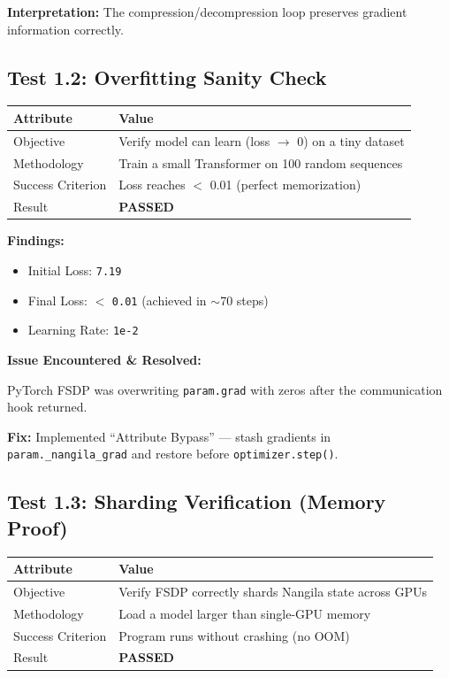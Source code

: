 \documentclass[11pt,a4paper]{article}
\begin{document}
\textbf{Interpretation:} The compression/decompression loop preserves gradient information correctly.

\subsection{Test 1.2: Overfitting Sanity Check}

\begin{table}[h]
\centering
\begin{tabular}{@{}ll@{}}
\toprule
\textbf{Attribute} & \textbf{Value} \\
\midrule
Objective & Verify model can learn (loss $\rightarrow$ 0) on a tiny dataset \\
Methodology & Train a small Transformer on 100 random sequences \\
Success Criterion & Loss reaches $<$ 0.01 (perfect memorization) \\
Result & \textcolor{pass}{\textbf{PASSED}} \\
\bottomrule
\end{tabular}
\end{table}

\textbf{Findings:}
\begin{itemize}
    \item Initial Loss: \texttt{7.19}
    \item Final Loss: $<$ \texttt{0.01} (achieved in $\sim$70 steps)
    \item Learning Rate: \texttt{1e-2}
\end{itemize}

\textbf{Issue Encountered \& Resolved:}

PyTorch FSDP was overwriting \texttt{param.grad} with zeros after the communication hook returned. 

\textbf{Fix:} Implemented ``Attribute Bypass'' --- stash gradients in \texttt{param.\_nangila\_grad} and restore before \texttt{optimizer.step()}.

\subsection{Test 1.3: Sharding Verification (Memory Proof)}

\begin{table}[h]
\centering
\begin{tabular}{@{}ll@{}}
\toprule
\textbf{Attribute} & \textbf{Value} \\
\midrule
Objective & Verify FSDP correctly shards Nangila state across GPUs \\
Methodology & Load a model larger than single-GPU memory \\
Success Criterion & Program runs without crashing (no OOM) \\
Result & \textcolor{pass}{\textbf{PASSED}} \\
\bottomrule
\end{tabular}
\end{table}
\end{document}
